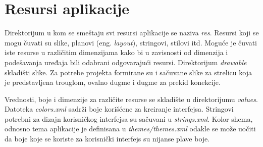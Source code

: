 \documentclass[implementacija.tex]{subfiles}
\begin{document}



\section{Resursi aplikacije}
Direktorijum u kom se smeštaju svi resursi aplikacije se naziva \textit{res}. Resursi koji se mogu čuvati su slike, planovi (eng. \textit{layout}), stringovi, stilovi itd. Moguće je čuvati iste resurse u različitim dimenzijama kako bi u zavisnosti od dimenzija i podešavanja uređaja bili odabrani odgovarajući resursi. Direktorijum \textit{drawable} skladišti slike. Za potrebe projekta formirane su i sačuvane slike za strelicu koja je predstavljena trouglom, ovalno dugme i dugme za prekid konekcije. 

Vrednosti, boje i dimenzije za različite resurse se skladište u direktorijumu \textit{values}. Datoteka \textit{colors.xml} sadrži boje korišćene za kreiranje interfejsa. Stringovi potrebni za dizajn korisničkog interfejsa su sačuvani u \textit{strings.xml}. Kolor shema, odnosno tema aplikacije je definisana u \textit{themes/themes.xml} odakle se može uočiti da boje koje se koriste za korisnički interfejs su nijanse plave boje. 
\end{document}
